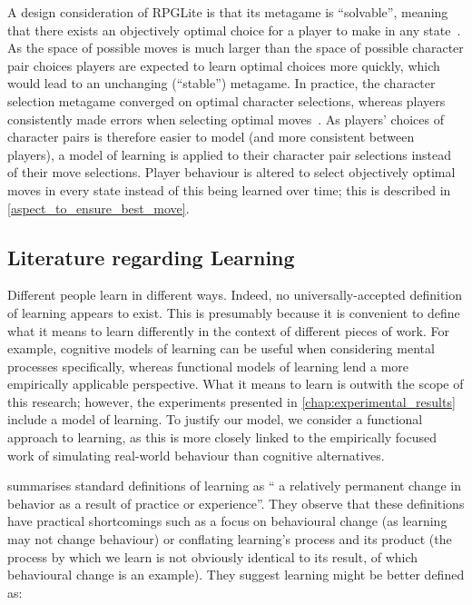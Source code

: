 A design consideration of RPGLite is that its metagame is ``solvable'', meaning
that there exists an objectively optimal choice for a player to make in any
state~\cite{kavanagh2021thesis}. As the space of possible moves is much larger
than the space of possible character pair choices players are expected to learn
optimal choices more quickly, which would lead to an unchanging (``stable'')
metagame. In practice, the character selection metagame converged on optimal
character selections, whereas players consistently made errors when selecting
optimal moves~\cite{kavanagh2021gameplay}. As players' choices of character
pairs is therefore easier to model (and more consistent between players), a
model of learning is applied to their character pair selections instead of their
move selections. Player behaviour is altered to select objectively optimal moves
in every state instead of this being learned over time; this is described in
\cref{aspect_to_ensure_best_move}.



\subsection{Literature regarding Learning}
\label{subsec:models_of_learning_discussed}

Different people learn in different ways. Indeed, no universally-accepted
definition of learning appears to exist. This is presumably because it is
convenient to define what it means to learn differently in the context of
different pieces of work. For example, cognitive models of learning can be
useful when considering mental processes specifically, whereas functional models
of learning lend a more empirically applicable perspective. What it means to
learn is outwith the scope of this research; however, the experiments presented
in \cref{chap:experimental_results} include a model of learning. To justify our
model, we consider a functional approach to learning, as this is more closely
linked to the empirically focused work of simulating real-world behaviour than
cognitive alternatives.

\citet{lachman1997learning} summarises standard definitions of learning as
``\textelp{} a relatively permanent change in behavior as a result of practice
or experience''. They observe that these definitions have practical shortcomings
such as a focus on behavioural change (as learning may not change behaviour) or
conflating learning's process and its product (the process by which we learn is
not obviously identical to its result, of which behavioural change is an
example). They suggest learning might be better defined as:

